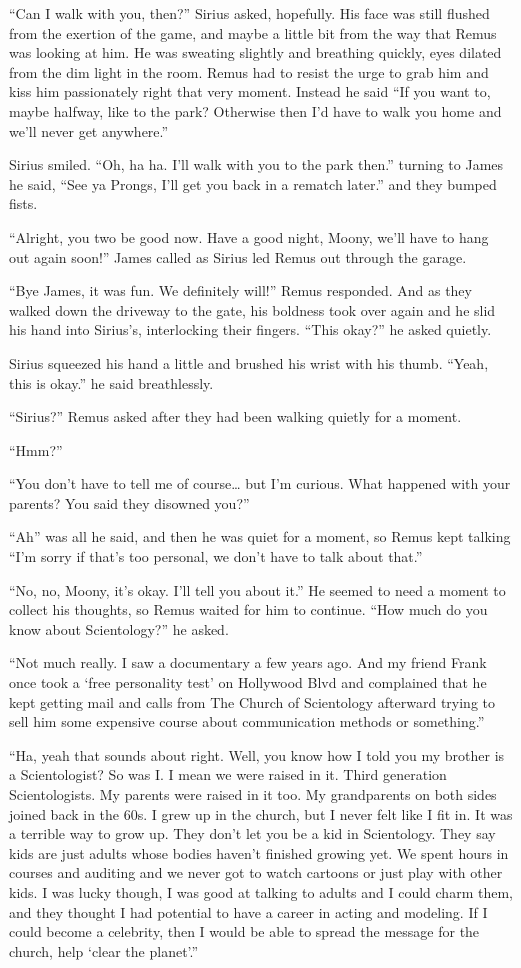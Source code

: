 \documentclass[12pt,twoside,openright]{memoir}
\begin{document}
``Can I walk with you, then?'' Sirius asked, hopefully. His face was still flushed from the exertion of the game, and maybe a little bit from the way that Remus was looking at him. He was sweating slightly and breathing quickly, eyes dilated from the dim light in the room. Remus had to resist the urge to grab him and kiss him passionately right that very moment. Instead he said ``If you want to, maybe halfway, like to the park? Otherwise then I'd have to walk you home and we'll never get anywhere.''

Sirius smiled. ``Oh, ha ha. I'll walk with you to the park then.'' turning to James he said, ``See ya Prongs, I'll get you back in a rematch later.'' and they bumped fists.

``Alright, you two be good now. Have a good night, Moony, we'll have to hang out again soon!'' James called as Sirius led Remus out through the garage.

``Bye James, it was fun. We definitely will!'' Remus responded. And as they walked down the driveway to the gate, his boldness took over again and he slid his hand into Sirius's, interlocking their fingers. ``This okay?'' he asked quietly.

Sirius squeezed his hand a little and brushed his wrist with his thumb. ``Yeah, this is okay.'' he said breathlessly. 

``Sirius?'' Remus asked after they had been walking quietly for a moment.

``Hmm?''

``You don't have to tell me of course… but I'm curious. What happened with your parents? You said they disowned you?''

``Ah'' was all he said, and then he was quiet for a moment, so Remus kept talking ``I'm sorry if that's too personal, we don't have to talk about that.''

``No, no, Moony, it's okay. I'll tell you about it.'' He seemed to need a moment to collect his thoughts, so Remus waited for him to continue. ``How much do you know about Scientology?'' he asked.

``Not much really. I saw a documentary a few years ago. And my friend Frank once took a `free personality test' on Hollywood Blvd and complained that he kept getting mail and calls from The Church of Scientology afterward trying to sell him some expensive course about communication methods or something.''

``Ha, yeah that sounds about right. Well, you know how I told you my brother is a Scientologist? So was I. I mean we were raised in it. Third generation Scientologists. My parents were raised in it too. My grandparents on both sides joined back in the 60s. I grew up in the church, but I never felt like I fit in. It was a terrible way to grow up. They don't let you be a kid in Scientology. They say kids are just adults whose bodies haven't finished growing yet. We spent hours in courses and auditing and we never got to watch cartoons or just play with other kids. I was lucky though, I was good at talking to adults and I could charm them, and they thought I had potential to have a career in acting and modeling. If I could become a celebrity, then I would be able to spread the message for the church, help `clear the planet'.''
\end{document}
